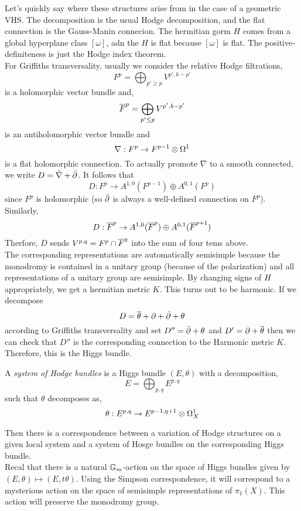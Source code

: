 \documentclass[12pt]{article}
\begin{document}
Let's quickly say where these structures arise from in the case of a geometric VHS. The decomposition is the usual Hodge decomposition, and the flat connection is the Gauss-Manin connecion. The hermitian gorm $H$ comes from a global hyperplane class $[\omega]$, adn the $H$ is flat because $[\omega]$ is flat. The positive-definiteness is just the Hodge index theorem. 
\bigskip\\
For Griffiths transversality, usually we consider the relative Hodge filtrations,
\[ F^p = \bigoplus_{p' \ge p} V^{p', k-p'} \]
is a holomorphic vector bundle and,
\[ \overline{F}^p = \bigoplus_{p' \le p} V^{p',k-p'} \]
is an antiholomorphic vector bundle and
\[ \nabla : F^p \to F^{p-1} \otimes \Omega^1 \]
is a flat holomorphic connection. To actually promote $\nabla$ to a smooth connected, we write $D = \tilde{\nabla} + \bar{\partial}$. It follows that
\[ D : F^{p} \to A^{1,0}(F^{p-1}) \oplus A^{0,1}(F^p) \]
since $F^p$ is holomorphic (so $\bar{\partial}$ is always a well-defined connection on $F^p$). Similarly,
\[ D : \overline{F}^p \to A^{1,0}(\overline{F}^p) \oplus A^{0,1}(\overline{F}^{p+1}) \]
Therfore, $D$ sends $V^{p,q} = F^p \cap \overline{F}^q$ into the sum of four tems above.
\bigskip\\
The corresponding representations are automatically semisimple because the monodromy is contained in a unitary group (because of the polarization) and all representations of a unitary group are semisimple. By changing signs of $H$ appropriately, we get a hermitian metric $K$. This turns out to be harmonic. If we decompose
\[ D = \overline{\theta} + \partial + \bar{\partial} + \theta \]
according to Griffiths transversality and set $D'' = \bar{\partial} + \theta$ and $D' = \partial + \overline{\theta}$ then we can check that $D''$ is the corresponding connection to the Harmonic metric $K$. Therefore, this is the Higgs bundle. 

\begin{defn}
A \textit{system of Hodge bundles} is a Higgs bundle $(E, \theta)$ with a decomposition,
\[ E = \bigoplus_{p, q} E^{p,q} \]
such that $\theta$ decomposes as,
\[ \theta : E^{p,q} \to E^{p-1, q+1} \otimes \Omega_X^1 \]
\end{defn}

Then there is a correspondence between a variation of Hodge structures on a given local system and a system of Hosge bundles on the corresponding Higgs bundle.
\bigskip\\
Recal that there is a natural $\mathbb{G}_m$-action on the space of Higgs bundles given by $(E, \theta) \mapsto (E, t \theta)$. Using the Simpson correspondence, it will correspond to a mysterious action on the space of semisimple representations of $\pi_1(X)$. This action will preserve the monodromy group.
\end{document}
